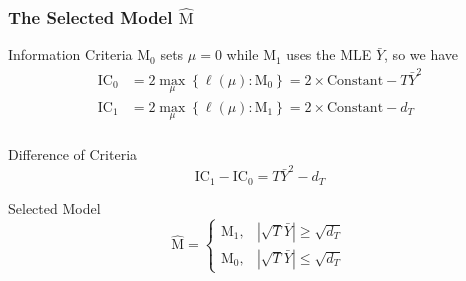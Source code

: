 \begin{frame}
  \frametitle{The Selected Model $\widehat{\text{M}}$}

  \begin{block}{Information Criteria}
  M$_0$ sets $\mu=0$ while M$_1$ uses the MLE $\bar{Y}$, so we have
  \vspace{1em}
  \begin{align*}
    \text{IC}_0 &= 2 \max_\mu \left\{ \ell(\mu) \colon \text{M}_0 \right\} = 2 \times \text{Constant} - T\bar{Y}^2\\ 
    \text{IC}_1 &= 2 \max_\mu \left\{ \ell(\mu) \colon \text{M}_1 \right\} = 2 \times \text{Constant} - d_T\\ 
  \end{align*}
\end{block}

\vspace{-2em}

  \begin{block}{Difference of Criteria}
    \vspace{-1em}
  \[
    \text{IC}_1 - \text{IC}_0 = T \bar{Y}^2 - d_T
  \]
\end{block}

\vspace{-1em}

  \begin{block}{Selected Model}
    \vspace{-1em}
   \[
     \widehat{\text{M}} = \left\{
       \begin{array}{cc}
         \text{M}_1, & |\sqrt{T} \bar{Y}| \geq \sqrt{d_T}\\
         \text{M}_0, & |\sqrt{T} \bar{Y}| \leq \sqrt{d_T}
       \end{array}
       \right.
   \]
  \end{block}
\end{frame}
